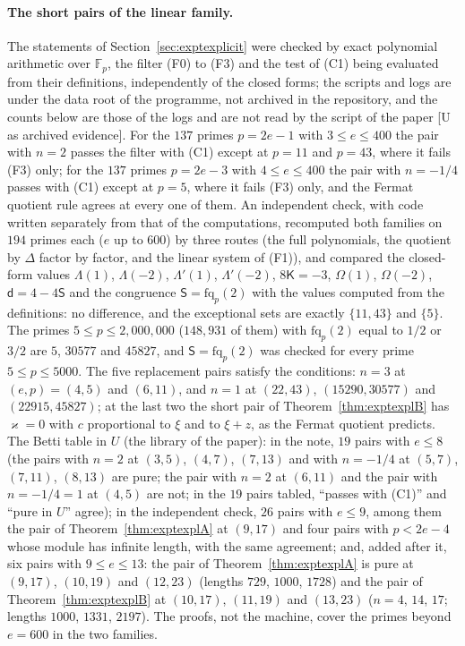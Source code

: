\documentclass[11pt]{article}
\theoremstyle{definition}
\theoremstyle{remark}
\newcommand{\F}{\mathbb{F}}
\begin{document}
\paragraph{The short pairs of the linear family.} The statements of Section~\ref{sec:exptexplicit} were checked by exact polynomial arithmetic over $\F_p$, the filter (F0) to (F3) and the test of (C1) being evaluated from their definitions, independently of the closed forms; the scripts and logs are under the data root of the programme, not archived in the repository, and the counts below are those of the logs and are not read by the script of the paper [U as archived evidence]. For the $137$ primes $p=2e-1$ with $3\le e\le400$ the pair with $n=2$ passes the filter with (C1) except at $p=11$ and $p=43$, where it fails (F3) only; for the $137$ primes $p=2e-3$ with $4\le e\le400$ the pair with $n=-1/4$ passes with (C1) except at $p=5$, where it fails (F3) only, and the Fermat quotient rule agrees at every one of them. An independent check, with code written separately from that of the computations, recomputed both families on $194$ primes each ($e$ up to $600$) by three routes (the full polynomials, the quotient by $\Delta$ factor by factor, and the linear system of (F1)), and compared the closed-form values $\Lambda(1)$, $\Lambda(-2)$, $\Lambda'(1)$, $\Lambda'(-2)$, $8\mathsf K=-3$, $\Omega(1)$, $\Omega(-2)$, $\mathsf d=4-4\mathsf S$ and the congruence $\mathsf S=\mathrm{fq}_p(2)$ with the values computed from the definitions: no difference, and the exceptional sets are exactly $\{11,43\}$ and $\{5\}$. The primes $5\le p\le2{,}000{,}000$ ($148{,}931$ of them) with $\mathrm{fq}_p(2)$ equal to $1/2$ or $3/2$ are $5$, $30577$ and $45827$, and $\mathsf S=\mathrm{fq}_p(2)$ was checked for every prime $5\le p\le5000$. The five replacement pairs satisfy the conditions: $n=3$ at $(e,p)=(4,5)$ and $(6,11)$, and $n=1$ at $(22,43)$, $(15290,30577)$ and $(22915,45827)$; at the last two the short pair of Theorem~\ref{thm:exptexplB} has $\varkappa=0$ with $c$ proportional to $\xi$ and to $\xi+z$, as the Fermat quotient predicts. The Betti table in $U$ (the library of the paper): in the note, $19$ pairs with $e\le8$ (the pairs with $n=2$ at $(3,5)$, $(4,7)$, $(7,13)$ and with $n=-1/4$ at $(5,7)$, $(7,11)$, $(8,13)$ are pure; the pair with $n=2$ at $(6,11)$ and the pair with $n=-1/4=1$ at $(4,5)$ are not; in the $19$ pairs tabled, ``passes with (C1)'' and ``pure in $U$'' agree); in the independent check, $26$ pairs with $e\le9$, among them the pair of Theorem~\ref{thm:exptexplA} at $(9,17)$ and four pairs with $p<2e-4$ whose module has infinite length, with the same agreement; and, added after it, six pairs with $9\le e\le13$: the pair of Theorem~\ref{thm:exptexplA} is pure at $(9,17)$, $(10,19)$ and $(12,23)$ (lengths $729$, $1000$, $1728$) and the pair of Theorem~\ref{thm:exptexplB} at $(10,17)$, $(11,19)$ and $(13,23)$ ($n=4$, $14$, $17$; lengths $1000$, $1331$, $2197$). The proofs, not the machine, cover the primes beyond $e=600$ in the two families.
\end{document}
